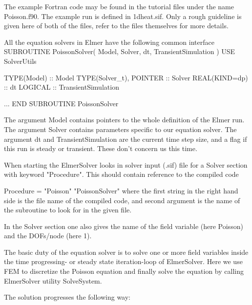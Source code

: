 The example Fortran code may be found in the tutorial files under the
name Poisson.f90.  The example run is defined in 1dheat.sif.
Only a rough guideline is given here of both of the files, refer to the
files themselves for more details.

All the  equation solvers in Elmer have the following common interface
\ttbegin
SUBROUTINE PoissonSolver( Model, Solver, dt, TransientSimulation )
  USE SolverUtils

  TYPE(Model) :: Model
  TYPE(Solver_t), POINTER :: Solver
  REAL(KIND=dp) :: dt
  LOGICAL :: TransientSimulation

    ...
END SUBROUTINE PoissonSolver
\ttend

The argument Model contains pointers to the whole definition of the Elmer run.
The argument Solver contains parameters specific to our equation solver.
The argument dt and TransientSimulation are the current time step size, and a
flag if this run is steady or transient. These don't concern us this time.

When starting the ElmerSolver looks in solver input (.sif) file for a
Solver section with keyword "Procedure". This should contain reference to
the compiled code

\ttbegin
   Procedure = "Poisson" "PoissonSolver"
\ttend
where the first string in the right hand side is the file name of the compiled
code, and second argument is the name of the subroutine to look for in the given file.

In the Solver section one also gives the name of the field variable
(here Poisson) and the DOFs/node (here 1).

The basic duty of the equation solver is to solve one or more field variables inside
the time progressing- or steady state iteration-loop of ElmerSolver.  Here we use
FEM to discretize the Poisson equation and finally solve the equation by calling
ElmerSolver utility SolveSystem.

The solution progresses the following way:

